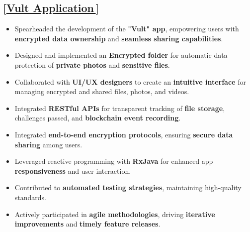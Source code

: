 \documentclass[letterpaper,1pt]{article}
\let\orighref\href
\renewcommand{\href}[2]{\orighref{#1}{#2\,\faExternalLink}}
\begin{document}
\vspace{-10pt}
\subsection*{[\href{https://play.google.com/store/apps/details?id=network.zus.vult&hl=en-US&ah=HGd0D5DYnNgKbjuxWV1AaOVbuyc}{Vult Application}]}
\begin{itemize}
  \vspace{-5pt}
  \item Spearheaded the development of the \textbf{"Vult" app}, empowering users with \textbf{encrypted data ownership} and \textbf{seamless sharing capabilities}.
  \item Designed and implemented an \textbf{Encrypted folder} for automatic data protection of \textbf{private photos} and \textbf{sensitive files}.
  \item Collaborated with \textbf{UI/UX designers} to create an \textbf{intuitive interface} for managing encrypted and shared files, photos, and videos.
  \item Integrated \textbf{RESTful APIs} for transparent tracking of \textbf{file storage}, challenges passed, and \textbf{blockchain event recording}.
  \item Integrated \textbf{end-to-end encryption protocols}, ensuring \textbf{secure data sharing} among users.
  \item Leveraged reactive programming with \textbf{RxJava} for enhanced app \textbf{responsiveness} and user interaction.
  \item Contributed to \textbf{automated testing strategies}, maintaining high-quality standards.
  \item Actively participated in \textbf{agile methodologies}, driving \textbf{iterative improvements} and \textbf{timely feature releases}.
\end{itemize}
\end{document}
